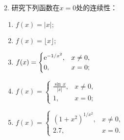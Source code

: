 2. 研究下列函数在$x=0$处的连续性：
\begin{enumerate}
    \item $f(x)=\lvert x \rvert$; 
    \item $f(x)=\lfloor x \rfloor$;
    \item $f(x)=\begin{cases}
       \mathrm{e}^{-1/x^2}, & x \neq 0, \\
       0, & x = 0;
    \end{cases}$ \\
    \item $f(x) = \begin{cases}
        \displaystyle\frac{\sin \, x}{\lvert x \rvert}, & x \neq 0, \\
        1, & x = 0;
    \end{cases}$
    \item $f(x)=\begin{cases}
        (1+x^2)^{1/x^2}, & x \neq 0, \\
        2.7, & x = 0.
    \end{cases}$
\end{enumerate}
